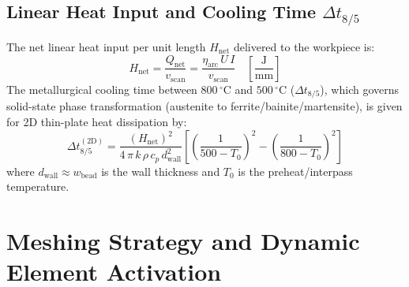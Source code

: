 \documentclass[10pt,a4paper]{article}
\begin{document}
\subsection{Linear Heat Input and Cooling Time $\Delta t_{8/5}$}
The net linear heat input per unit length $H_{\mathrm{net}}$ delivered to the workpiece is:
\begin{equation}
H_{\mathrm{net}} = \frac{Q_{\mathrm{net}}}{v_{\mathrm{scan}}} = \frac{\eta_{\mathrm{arc}}\,U\,I}{v_{\mathrm{scan}}} \quad \left[\frac{\mathrm{J}}{\mathrm{mm}}\right]
\end{equation}
The metallurgical cooling time between $800\,^\circ\mathrm{C}$ and $500\,^\circ\mathrm{C}$ ($\Delta t_{8/5}$), which governs solid-state phase transformation (austenite to ferrite/bainite/martensite), is given for 2D thin-plate heat dissipation by:
\begin{equation}
\Delta t_{8/5}^{(2\mathrm{D})} = \frac{(H_{\mathrm{net}})^2}{4\,\pi\,k\,\rho\,c_p\,d_{\mathrm{wall}}^2}\left[\left(\frac{1}{500 - T_0}\right)^2 - \left(\frac{1}{800 - T_0}\right)^2\right]
\end{equation}
where $d_{\mathrm{wall}} \approx w_{\mathrm{bead}}$ is the wall thickness and $T_0$ is the preheat/interpass temperature.

\section{Meshing Strategy and Dynamic Element Activation}
\end{document}
